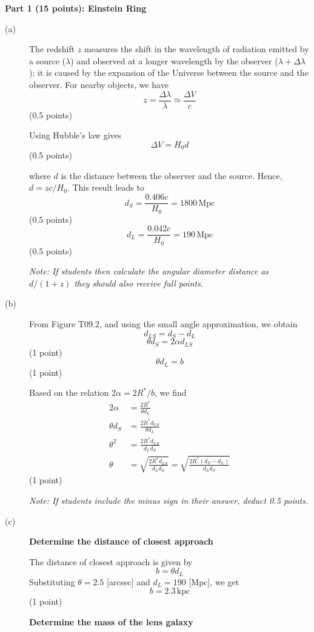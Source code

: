 \noindent\textbf{Part 1 (15 points): Einstein Ring}

\begin{description}
\item[(a)] The redshift $z$ measures the shift in the wavelength of radiation
  emitted by a source ($\lambda$) and observed at a longer wavelength by the
  observer ($\lambda + \Delta\lambda$); it is caused by the expansion of the
  Universe between the source and the observer. For nearby objects, we have
  \[ z = \frac{\Delta\lambda}{\lambda} \simeq \frac{\Delta V}{c} \]
  \hfill(0.5 points)

  Using Hubble's law gives
  \[ \Delta V = H_0 d \]
  \hfill(0.5 points)

  where $d$ is the distance between the observer and the source. Hence,
  $d = zc/H_0$. This result leads to
  \[ d_S = \frac{0.406c}{H_0} = 1800\,\mathrm{Mpc} \]
  \hfill(0.5 points)
  \[ d_L = \frac{0.042c}{H_0} = 190\,\mathrm{Mpc} \]
  \hfill(0.5 points)

  \textit{Note: If students then calculate the angular diameter distance as
  $d/(1+z)$ they should also receive full points.}

\item[(b)] From Figure T09.2, and using the small angle approximation, we
  obtain
  \[ d_{LS} = d_S - d_L \]
  \[ \theta d_S = 2\alpha d_{LS} \]
  \hfill(1 point)
  \[ \theta d_L = b \]
  \hfill(1 point)

  Based on the relation $2\alpha = 2R^*/b$, we find
  \begin{align*}
    2\alpha &= \frac{2R^*}{\theta d_L} \\
    \theta d_S &= \frac{2R^* d_{LS}}{\theta d_L} \\
    \theta^2 &= \frac{2R^* d_{LS}}{d_L d_S} \\
    \theta &= \sqrt{\frac{2R^* d_{LS}}{d_L d_S}}
            = \sqrt{\frac{2R^*(d_S - d_L)}{d_L d_S}}
  \end{align*}
  \hfill(1 point)

  \textit{Note: If students include the minus sign in their answer, deduct
  0.5 points.}

\item[(c)] \textbf{Determine the distance of closest approach}

  The distance of closest approach is given by
  \[ b = \theta d_L \]
  Substituting $\theta = 2.5$ [arcsec] and $d_L = 190$ [Mpc], we get
  \[ b = 2.3\,\mathrm{kpc} \]
  \hfill(1 point)

  \textbf{Determine the mass of the lens galaxy}


\end{description}

